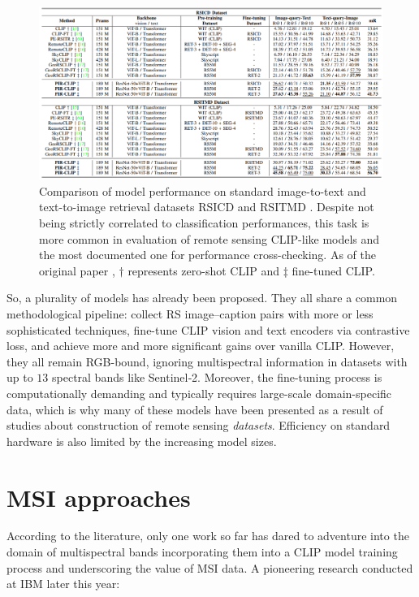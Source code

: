 \documentclass[a4paper, oneside, english]{sapthesis} %
\begin{document}
\begin{figure}[h]
    \centering
    \includegraphics[width=\textwidth]{img/PIRCLIP_summary_results.png}
    \caption{Comparison of model performance on standard image-to-text and text-to-image retrieval datasets RSICD \cite{lu2017exploring} and RSITMD \cite{yuan2022exploring}. Despite not being strictly correlated to classification performances, this task is more common in evaluation of remote sensing CLIP-like models and the most documented one for performance cross-checking. As of the original paper \cite{pan2024pir}, $\dagger$ represents zero-shot CLIP and $\ddagger$ fine-tuned CLIP.}
    \label{fig:pirclip}
\end{figure}


So, a plurality of models has already been proposed. They all share a common methodological pipeline: collect RS image–caption pairs with more or less sophisticated techniques, fine-tune CLIP vision and text encoders via contrastive loss, and achieve more and more significant gains over vanilla CLIP. However, they all remain RGB-bound, ignoring multispectral information in datasets with up to $13$ spectral bands like Sentinel‑2. Moreover, the fine-tuning process is computationally demanding and typically requires large-scale domain-specific data, which is why many of these models have been presented as a result of studies about construction of remote sensing \emph{datasets}. Efficiency on standard hardware is also limited by the increasing model sizes.


\section{MSI approaches}

According to the literature, only one work so far has dared to adventure into the domain of multispectral bands incorporating them into a CLIP model training process and underscoring the value of MSI data. A pioneering research conducted at IBM later this year: 
\end{document}
